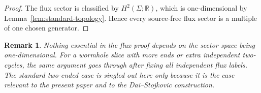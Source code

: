 \documentclass[aps,prd,onecolumn,nofootinbib,superscriptaddress]{revtex4-2}
\newtheorem{remark}{Remark}
\begin{document}
\begin{proof}
The flux sector is classified by $H^2(\Sigma;\mathbb{R})$, which is one-dimensional by Lemma~\ref{lem:standard-topology}. Hence every source-free flux sector is a multiple of one chosen generator.
\end{proof}

\begin{remark}
Nothing essential in the flux proof depends on the sector space being one-dimensional. For a wormhole slice with more ends or extra independent two-cycles, the same argument goes through after fixing \emph{all} independent flux labels. The standard two-ended case is singled out here only because it is the case relevant to the present paper and to the Dai--Stojkovic construction.
\end{remark}



\end{document}
